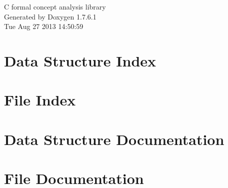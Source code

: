 \documentclass[a4paper]{book}
\begin{document}
\hypersetup{pageanchor=false,citecolor=blue}
\begin{titlepage}
\vspace*{7cm}
\begin{center}
{\Large \-C formal concept analysis library }\\
\vspace*{1cm}
{\large \-Generated by Doxygen 1.7.6.1}\\
\vspace*{0.5cm}
{\small Tue Aug 27 2013 14:50:59}\\
\end{center}
\end{titlepage}
\clearemptydoublepage
{}
\tableofcontents
\clearemptydoublepage
{}
\hypersetup{pageanchor=true,citecolor=blue}
\chapter{\-Data \-Structure \-Index}

\chapter{\-File \-Index}

\chapter{\-Data \-Structure \-Documentation}













\chapter{\-File \-Documentation}





















\printindex
\end{document}
